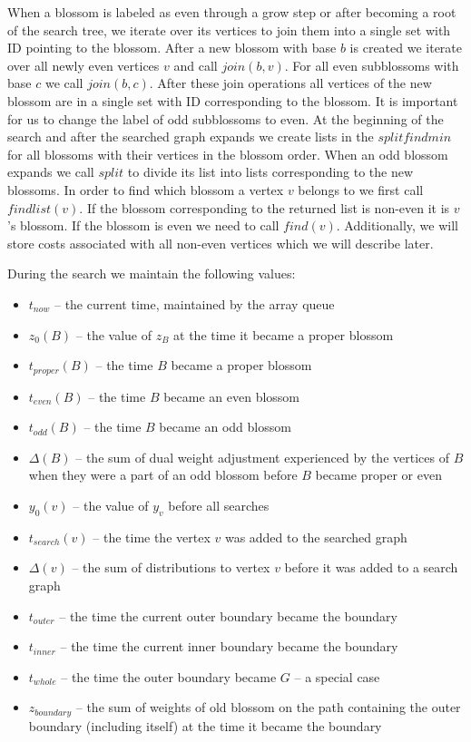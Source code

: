 When a blossom is labeled as even through a grow step or after becoming a root of the search tree, we iterate over its vertices to join them into a single set with ID pointing to the blossom. After a new blossom with base $b$ is created we iterate over all newly even vertices $v$ and call $join(b, v)$. For all even subblossoms with base $c$ we call $join(b, c)$. After these join operations all vertices of the new blossom are in a single set with ID corresponding to the blossom. It is important for us to change the label of odd subblossoms to even. At the beginning of the search and after the searched graph expands we create lists in the $splitfindmin$ for all blossoms with their vertices in the blossom order. When an odd blossom expands we call $split$ to divide its list into lists corresponding to the new blossoms. In order to find which blossom a vertex $v$ belongs to we first call $findlist(v)$. If the blossom corresponding to the returned list is non-even it is $v$'s blossom. If the blossom is even we need to call $find(v)$. Additionally, we will store costs associated with all non-even vertices which we will describe later.

During the search we maintain the following values:

\begin{itemize}
    \item $t_{now}$ – the current time, maintained by the array queue
    \item $z_0(B)$ – the value of $z_B$ at the time it became a proper blossom
    \item $t_{proper}(B)$ – the time $B$ became a proper blossom
    \item $t_{even}(B)$ – the time $B$ became an even blossom
    \item $t_{odd}(B)$ – the time $B$ became an odd blossom
    \item $\Delta(B)$ – the sum of dual weight adjustment experienced by the vertices of $B$ when they were a part of an odd blossom before $B$ became proper or even
    \item $y_0(v)$ – the value of $y_v$ before all searches
    \item $t_{search}(v)$ – the time the vertex $v$ was added to the searched graph
    \item $\Delta(v)$ – the sum of distributions to vertex $v$ before it was added to a search graph
    \item $t_{outer}$ – the time the current outer boundary became the boundary
    \item $t_{inner}$ – the time the current inner boundary became the boundary
    \item $t_{whole}$ – the time the outer boundary became $G$ – a special case
    \item $z_{boundary}$ – the sum of weights of old blossom on the path containing the outer boundary (including itself) at the time it became the boundary
\end{itemize}

